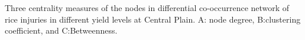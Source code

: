 Three centrality measures of the nodes in differential co-occurrence network of rice injuries in different yield levels at Central Plain. A: node degree, B:clustering coefficient, and C:Betweenness.
\label{fig:nodepropdifyieldCP}